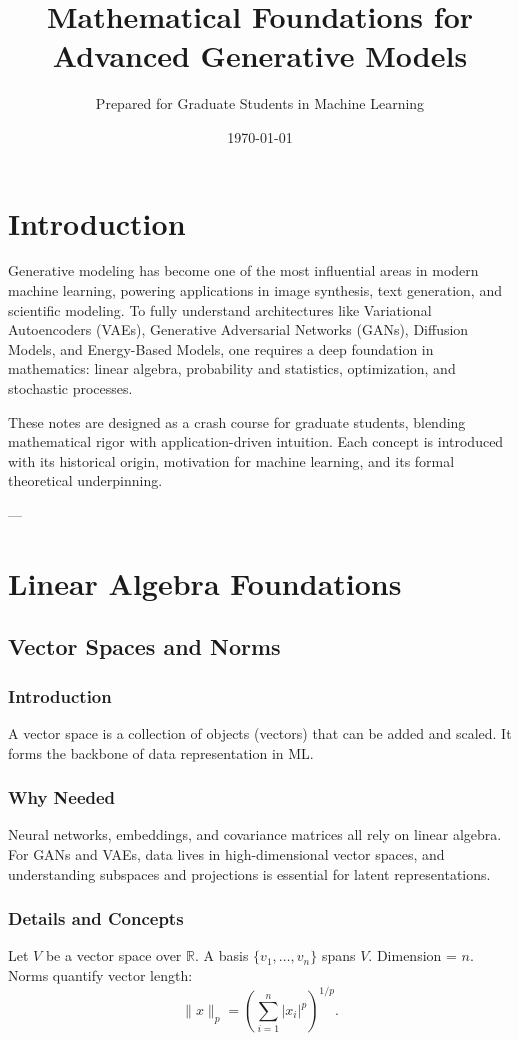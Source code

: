 \documentclass[11pt]{book}
\title{Mathematical Foundations for Advanced Generative Models}
\author{Prepared for Graduate Students in Machine Learning}
\date{\today}
\begin{document}
\maketitle
\tableofcontents

\chapter{Introduction}
Generative modeling has become one of the most influential areas in modern machine learning, powering applications in image synthesis, text generation, and scientific modeling. To fully understand architectures like Variational Autoencoders (VAEs), Generative Adversarial Networks (GANs), Diffusion Models, and Energy-Based Models, one requires a deep foundation in mathematics: linear algebra, probability and statistics, optimization, and stochastic processes.

These notes are designed as a crash course for graduate students, blending mathematical rigor with application-driven intuition. Each concept is introduced with its historical origin, motivation for machine learning, and its formal theoretical underpinning.

---

\chapter{Linear Algebra Foundations}

\section{Vector Spaces and Norms}
\subsection{Introduction}
A vector space is a collection of objects (vectors) that can be added and scaled. It forms the backbone of data representation in ML.

\subsection{Why Needed}
Neural networks, embeddings, and covariance matrices all rely on linear algebra. For GANs and VAEs, data lives in high-dimensional vector spaces, and understanding subspaces and projections is essential for latent representations.

\subsection{Details and Concepts}
Let $V$ be a vector space over $\mathbb{R}$. A basis $\{v_1, \dots, v_n\}$ spans $V$. Dimension = $n$.  
Norms quantify vector length:
\[
\|x\|_p = \left(\sum_{i=1}^n |x_i|^p \right)^{1/p}.
\]
\end{document}
